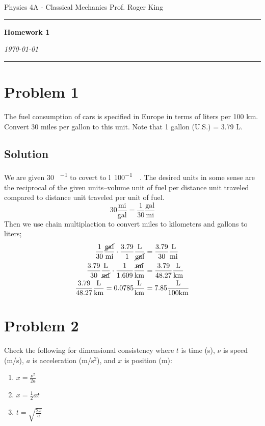 \documentclass{article}
\newcommand{\mile}{\text{mi}}
\newcommand{\gallon}{\text{gal}}
\newcommand{\kilo}{\text{k}}
\newcommand{\liter}{\text{L}}
\newcommand{\meter}{\text{m}}
\begin{document}
\flushleft
Physics 4A - Classical Mechanics \hfill Prof. Roger King\\

\hrule

\begin{center}
    \vspace{14pt}
    \textbf{\LARGE Homework 1} \\
    \vspace{12pt}

    \textit{\today}
    \vspace{14pt}
\end{center}

\hrule

\section*{Problem 1}
The fuel consumption of cars is specified in Europe in terms of liters per 100 km. Convert
30 miles per gallon to this unit. Note that 1 gallon (U.S.) = 3.79 L.

\subsection*{Solution}
We are given 30 \si{{\mile\per\gallon}} to covert to \si{{\litre\per100\kilo\meter}}. The desired units in some sense are the reciprocal of the given units--volume unit of fuel per distance unit traveled compared to distance unit traveled per unit of fuel.
\[
	30 \frac{\mile}{\gallon} = \frac{1}{30} \frac{\text{gal}}{\mile}
\]
Then we use chain multiplaction to convert miles to kilometers and gallons to liters;
\begin{align*}
	\frac{1}{30} \frac{\cancel{\gallon}}{\mile} \cdot \frac{3.79}{1} \frac{\liter}{\cancel{\gallon}} &= \frac{3.79}{30} \frac{\liter}{\mile} \\
	\frac{3.79}{30} \frac{\liter}{\cancel{\mile}} \cdot \frac{1}{1.609} \frac{\cancel{\mile}}{\kilo\meter} &= \frac{3.79}{48.27} \frac{\liter}{\kilo\meter} \\
	\frac{3.79}{48.27} \frac{\liter}{\kilo\meter} = 0.0785 \frac{\liter}{\kilo\meter} &= 7.85 \frac{\liter}{100 \kilo\meter}
\end{align*}

\section*{Problem 2}
Check the following for dimensional consistency where $t$ is time (s), $\nu$ is speed (m/s), $a$ is acceleration (m/s$^2$), and $x$ is position (m):
\begin{enumerate}
	\item $x = \frac{\nu^2}{2a}$
	\item $x = \frac{1}{2}at$
	\item $t = \sqrt{\frac{2x}{a}}$
\end{enumerate}
\end{document}
